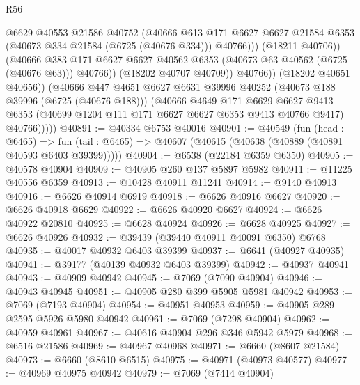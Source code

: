 \begin{lexlean}{R56}
\begin{coremodule}
                          @6629
                          @40553
                          @21586
                          @40752
                          (@40666
                            @613
                            @171
                            @6627
                            @6627
                            @21584
                            @6353
                            (@40673 @334 @21584 (@6725 (@40676 @334)))
                            @40766)))
                      (@18211 @40706))
                    (@40666
                      @383
                      @171
                      @6627
                      @6627
                      @40562
                      @6353
                      (@40673 @63 @40562 (@6725 (@40676 @63)))
                      @40766))
                  (@18202 @40707 @40709))
                @40766))
            (@18202 @40651 @40656))
          (@40666
            @447
            @4651
            @6627
            @6631
            @39996
            @40252
            (@40673 @188 @39996 (@6725 (@40676 @188)))
            (@40666
              @4649
              @171
              @6629
              @6627
              @9413
              @6353
              (@40699 @1204 @111 @171 @6627 @6627 @6353 @9413 @40766 @9417)
              @40766)))))
@40891 := @40334 @6753 @40016
@40901 := @40549
    (fun (head : @6465) =>
    fun (tail : @6465) => @40607 (@40615 (@40638 (@40889 (@40891 @40593 @6403 @39399)))))
@40904 := @6538 (@22184 @6359 @6350)
@40905 := @40578 @40904
@40909 := @40905 @260 @137 @5897 @5982
@40911 := @11225 @40556 @6359
@40913 := @10428 @40911 @11241
@40914 := @9140 @40913
@40916 := @6626 @40914 @6919
@40918 := @6626 @40916 @6627
@40920 := @6626 @40918 @6629
@40922 := @6626 @40920 @6627
@40924 := @6626 @40922 @20810
@40925 := @6628 @40924
@40926 := @6628 @40925
@40927 := @6626 @40926
@40932 := @39439 (@39440 @40911 @40091 @6350) @6768
@40935 := @40017 @40932 @6403 @39399
@40937 := @6641 (@40927 @40935)
@40941 := @39177 (@40139 @40932 @6403 @39399)
@40942 := @40937 @40941
@40943 := @40909 @40942
@40945 := @7069 (@7090 @40904)
@40946 := @40943 @40945
@40951 := @40905 @280 @399 @5905 @5981 @40942
@40953 := @7069 (@7193 @40904)
@40954 := @40951 @40953
@40959 := @40905 @289 @2595 @5926 @5980 @40942
@40961 := @7069 (@7298 @40904)
@40962 := @40959 @40961
@40967 := @40616 @40904 @296 @346 @5942 @5979
@40968 := @6516 @21586
@40969 := @40967 @40968
@40971 := @6660 (@8607 @21584)
@40973 := @6660 (@8610 @6515)
@40975 := @40971 (@40973 @40577)
@40977 := @40969 @40975 @40942
@40979 := @7069 (@7414 @40904)

\end{coremodule}
\end{lexlean}
